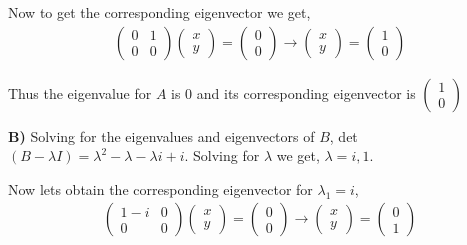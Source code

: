 \documentclass[12pt]{article}
\begin{document}
    Now to get the corresponding eigenvector we get,
    \begin{align*}
        \begin{pmatrix}
            0 & 1 \\
            0 & 0
            \end{pmatrix} \begin{pmatrix}
                x \\ y
            \end{pmatrix} = \begin{pmatrix}
                0 \\ 0
            \end{pmatrix} \rightarrow \begin{pmatrix}x \\ y \end{pmatrix} = \begin{pmatrix}1 \\ 0 \end{pmatrix}
    \end{align*}

    Thus the eigenvalue for $A$ is 0 and its corresponding eigenvector is $\begin{pmatrix}1 \\ 0 \end{pmatrix}$

    \textbf{B)} Solving for the eigenvalues and eigenvectors of $B$, det$(B - \lambda I) = \lambda^2 -\lambda -\lambda i + i$. Solving for $\lambda$ we get, $\lambda = i,1$. 

    Now lets obtain the corresponding eigenvector for $\lambda_1 = i$,
    \begin{align*}
        \begin{pmatrix}
            1-i & 0 \\
            0 & 0
        \end{pmatrix} \begin{pmatrix}x\\ y \end{pmatrix} = \begin{pmatrix}0 \\ 0 \end{pmatrix} \rightarrow \begin{pmatrix}x\\ y\end{pmatrix} = \begin{pmatrix}0 \\ 1 \end{pmatrix}
    \end{align*}
\end{document}
